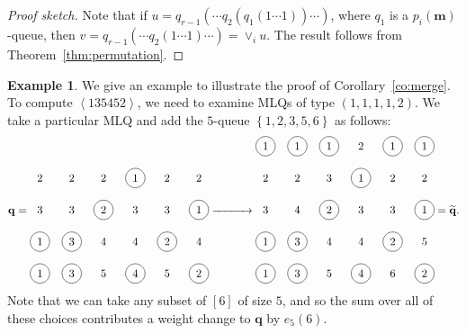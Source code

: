 \documentclass[reqno]{amsart}
\newcommand{\0}{\phantom{c}}
\newcommand{\swt}[1]{\left\langle #1 \right\rangle} %
\newcommand{\merge}[1]{\vee_{#1}} %
\newcommand{\mm}{\mathbf{m}}
\newcommand{\qq}{\mathbf{q}}
\newcommand{\set}[1]{\left\{ #1 \right\}}
\newcommand{\ive}[1]{\left[ #1 \right]}
\theoremstyle{plain}
\theoremstyle{definition}
\newtheorem{example}[thm]{Example}
\numberwithin{equation}{section}
\begin{document}
\begin{proof}[Proof sketch]
  Note that if $u = q_{r-1}( \cdots q_2(q_1(1 \dotsm 1)) \cdots)$, where $q_1$ is a $p_i(\mm)$-queue, then $v = q_{r-1}( \cdots q_2(1 \dotsm 1) \cdots) = \merge{i} u$.
  The result follows from Theorem~\ref{thm:permutation}.
\end{proof}

\begin{example}
We give an example to illustrate the proof of Corollary~\ref{co:merge}.
To compute $\swt{135452}$, we need to examine MLQs of type $(1,1,1,1,2)$.
We take a particular MLQ and add the $5$-queue $\set{1,2,3,5,6}$ as follows:
\[
\qq =
\begin{tikzpicture}[baseline=82]
\node at (0, 4){2};\node at (1, 4){2};\node at (2, 4){2};\node[circle, draw=black] at (3, 4){1};\node at (4, 4){2};\node at (5, 4){2};\node at (0, 3){3};\node at (1, 3){3};\node[circle, draw=black] at (2, 3){2};\node at (3, 3){3};\node at (4, 3){3};\node[circle, draw=black] at (5, 3){1};\node[circle, draw=black] at (0, 2){1};\node[circle, draw=black] at (1, 2){3};\node at (2, 2){4};\node at (3, 2){4};\node[circle, draw=black] at (4, 2){2};\node at (5, 2){4};\node[circle, draw=black] at (0, 1){1};\node[circle, draw=black] at (1, 1){3};\node at (2, 1){5};\node[circle, draw=black] at (3, 1){4};\node at (4, 1){5};\node[circle, draw=black] at (5, 1){2};
\end{tikzpicture}
\xrightarrow{\hspace{30pt}}
\begin{tikzpicture}[baseline=82]
\node[circle, draw=black] at (0, 5){1};\node[circle, draw=black] at (1, 5){1};\node[circle, draw=black] at (2, 5){1};\node at (3, 5){2};\node[circle, draw=black] at (4, 5){1};\node[circle, draw=black] at (5, 5){1};\node at (0, 4){2};\node at (1, 4){2};\node at (2, 4){3};\node[circle, draw=black] at (3, 4){1};\node at (4, 4){2};\node at (5, 4){2};\node at (0, 3){3};\node at (1, 3){4};\node[circle, draw=black] at (2, 3){2};\node at (3, 3){3};\node at (4, 3){3};\node[circle, draw=black] at (5, 3){1};\node[circle, draw=black] at (0, 2){1};\node[circle, draw=black] at (1, 2){3};\node at (2, 2){4};\node at (3, 2){4};\node[circle, draw=black] at (4, 2){2};\node at (5, 2){5};\node[circle, draw=black] at (0, 1){1};\node[circle, draw=black] at (1, 1){3};\node at (2, 1){5};\node[circle, draw=black] at (3, 1){4};\node at (4, 1){6};\node[circle, draw=black] at (5, 1){2};
\end{tikzpicture}
= \widetilde{\qq}.
\]
Note that we can take any subset of $\ive{6}$ of size $5$, and so the sum over all of these choices contributes a weight change to $\qq$ by $e_5(6)$.

\end{example}
\end{document}
